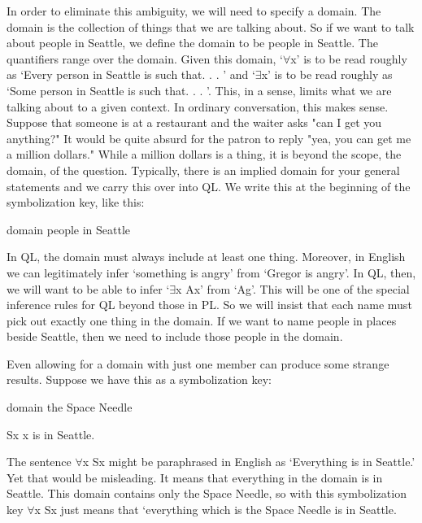 In order to eliminate this ambiguity, we will need to specify a domain. The domain is the collection of things that we are talking about. So if we want to talk about people in Seattle, we define the domain to be people in Seattle. The quantifiers range over the domain. Given this domain, ‘$\forall$x’ is to be read roughly as ‘Every person in Seattle is such that. . . ’ and  ‘$\exists$x’ is to be read roughly as ‘Some person in Seattle is such that. . . ’. This, in a sense, limits what we are talking about to a given context. In ordinary conversation, this makes sense. Suppose that someone is at a restaurant and the waiter asks "can I get you anything?" It would be quite absurd for the patron to reply "yea, you can get me a million dollars." While a million dollars is a thing, it is beyond the scope, the domain, of the question. Typically, there is an implied domain for your general statements and we carry this over into QL. We write this at the beginning of the symbolization key, like this:
\begin{ekey}
\item[domain] people in Seattle
\end{ekey}
In QL, the domain must always include at least one thing. Moreover, in English we can legitimately infer ‘something is angry’ from ‘Gregor is angry’. In QL, then, we will want to be able to infer ‘$\exists$x Ax’ from ‘Ag’. This will be one of the special inference rules for QL beyond those in PL. So we will insist that each name must pick out exactly one thing in the domain. If we want to name people in places beside Seattle, then we need to include those people in the domain.

Even allowing for a domain with just one member can produce some strange results. Suppose we have this as a symbolization key:
\begin{ekey}
\item[domain] the Space Needle
\item[Sx] x is in Seattle.
\end{ekey}
The sentence $\forall$x Sx might be paraphrased in English as ‘Everything is in Seattle.’ Yet that would be misleading. It means that everything in the domain is in Seattle. This domain contains only the Space Needle, so with this symbolization key $\forall$x Sx just means that ‘everything which is the Space Needle is in Seattle.
